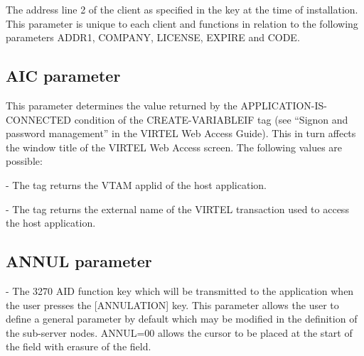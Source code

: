 \documentclass[letterpaper,10pt,english]{sphinxmanual}
\begin{document}
The address line 2 of the client as specified in the key at the time of installation. This parameter is unique to each client and functions in relation to the following parameters ADDR1, COMPANY, LICENSE, EXPIRE and CODE.


\subsection{AIC parameter}
\label{\detokenize{Installation_Guide:index-32}}\label{\detokenize{Installation_Guide:aic-parameter}}
\begin{sphinxVerbatim}[commandchars=\\\{\}]
 
\end{sphinxVerbatim}

This parameter determines the value returned by the APPLICATION-IS-CONNECTED condition of the CREATE-VARIABLEIF tag (see “Signon and password management” in the VIRTEL Web Access Guide). This in turn affects the window title of the VIRTEL Web Access screen. The following values are possible:

 - The tag returns the VTAM applid of the host application.

 - The tag returns the external name of the VIRTEL transaction used to access the host application.


\subsection{ANNUL parameter}
\label{\detokenize{Installation_Guide:index-33}}\label{\detokenize{Installation_Guide:annul-parameter}}
\begin{sphinxVerbatim}[commandchars=\\\{\}]
  
\end{sphinxVerbatim}

 - The 3270 AID function key which will be transmitted to the application when the user presses the {[}ANNULATION{]} key. This parameter allows the user to define a general parameter by default which may be modified in the definition of the sub-server nodes.
ANNUL=00 allows the cursor to be placed at the start of the field with erasure of the field.
\end{document}
